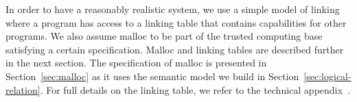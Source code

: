 \documentclass[format=acmsmall, review=true, screen=true]{acmart}
\renewcommand{\sectionname}{Section}
\newcommand{\itoplas}[1]{#1}
\newcommand{\itoplassug}[1]{}
\begin{document}
In order to have a reasonably realistic system, we use a simple model of linking
where a program has access to a linking table that contains capabilities for
other programs. We also assume malloc to be part of the trusted computing base
satisfying a certain specification. Malloc and linking tables are described
further in the next section.
\itoplas{The specification of malloc is presented in \sectionname~\ref{sec:malloc} as it uses the semantic model we build in Section~\ref{sec:logical-relation}.
For full details on the linking table, we refer to the technical
appendix~\citep{technical_appendix}.} \itoplassug{(Reviewer A, esop suggest explaining the
  linking model)\\}
\itoplassug{Suggestion: We also have the flag table used
  for assertions, maybe we should add a description of it here.\\}
\end{document}
